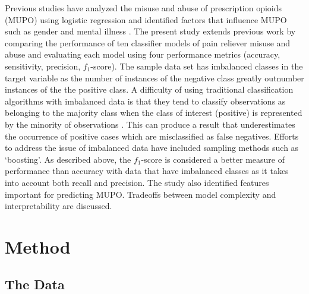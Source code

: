 \documentclass[sigconf]{acmart}
\begin{document}
Previous studies have analyzed the misuse and abuse of prescription opioids
(MUPO) using logistic regression and identified factors that influence MUPO 
such as gender and mental illness \cite{rice12, unick13, jones15, mccabe12}. 
The present study extends previous work by comparing the performance of ten 
classifier models of pain reliever misuse and abuse and evaluating each model 
using four performance metrics (accuracy, sensitivity, precision, $f_1$-score). 
The sample data set has imbalanced classes in the target variable as the 
number of instances of the negative class greatly outnumber instances of the 
the positive class. A difficulty of using traditional classification algorithms
with imbalanced data is that they tend to classify observations as belonging 
to the majority class when the class of interest (positive) is represented by
the minority of observations \cite{brown12, yun09}. This can produce a result 
that underestimates the occurrence of positive cases which are misclassified as 
false negatives. Efforts to address the issue of imbalanced data have included 
sampling methods such as `boosting'. As described above, the $f_1$-score is 
considered a better measure of performance than accuracy with data that have 
imbalanced classes as it takes into account both recall and precision. The 
study also identified features important for predicting MUPO. Tradeoffs 
between model complexity and interpretability are discussed. 


\section{Method}

\subsection{The Data}
\end{document}
